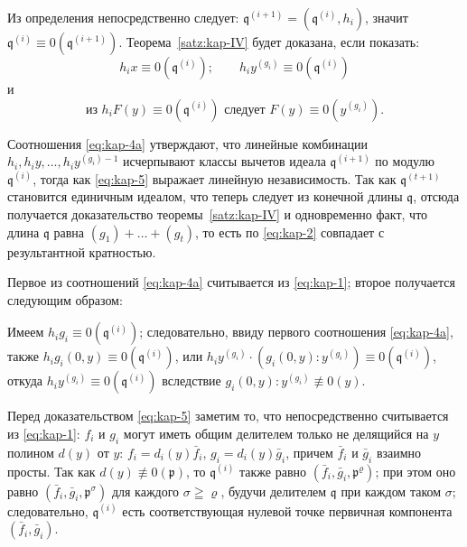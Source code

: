 \documentclass[11pt]{article}
\theoremstyle{plain}
\begin{document}
Из определения непосредственно следует:
$\mathfrak{q}^{(i+1)} = (\mathfrak{q}^{(i)}, h_{i})$, значит
$\mathfrak{q}^{(i)} \equiv 0(\mathfrak{q}^{(i+1)})$.
Теорема~\ref{satz:kap-IV} будет доказана, если показать:
\begin{equation}\label{eq:kap-4a}
h_{i}x \equiv 0(\mathfrak{q}^{(i)}); \qquad
h_{i}y^{(g_{i})} \equiv 0(\mathfrak{q}^{(i)})
\end{equation}
и
\begin{equation}\label{eq:kap-5}
\text{из } h_{i}F(y) \equiv 0(\mathfrak{q}^{(i)})
\text{ следует } F(y) \equiv 0(y^{(g_{i})}).
\end{equation}

Соотношения \eqref{eq:kap-4a} утверждают, что линейные комбинации
$h_{i}, h_{i}y, \ldots, h_{i}y^{(g_{i})-1}$ исчерпывают классы
вычетов идеала $\mathfrak{q}^{(i+1)}$ по модулю
$\mathfrak{q}^{(i)}$, тогда как \eqref{eq:kap-5} выражает линейную
независимость. Так как $\mathfrak{q}^{(t+1)}$ становится единичным
идеалом, что теперь следует из конечной длины $\mathfrak{q}$, отсюда
получается доказательство теоремы~\ref{satz:kap-IV} и одновременно
факт, что длина $\mathfrak{q}$ равна
$(g_1)+\ldots+(g_t)$, то есть по \eqref{eq:kap-2} совпадает
с результантной кратностью.

Первое из соотношений \eqref{eq:kap-4a} считывается из
\eqref{eq:kap-1}; второе получается следующим образом:

Имеем $h_{i}g_{i} \equiv 0(\mathfrak{q}^{(i)})$; следовательно, ввиду
первого соотношения \eqref{eq:kap-4a}, также
$h_{i}g_{i}(0,y) \equiv 0(\mathfrak{q}^{(i)})$, или
$h_iy^{(g_i)}\cdot(g_i(0,y):y^{(g_i)})\equiv0(\mathfrak{q}^{(i)})$,
откуда $h_{i}y^{(g_{i})} \equiv 0(\mathfrak{q}^{(i)})$
вследствие $g_{i}(0,y):y^{(g_{i})} \not\equiv 0(y)$.

Перед доказательством \eqref{eq:kap-5} заметим то, что
непосредственно считывается из \eqref{eq:kap-1}: $f_{i}$ и $g_{i}$
могут иметь общим делителем только не делящийся на $y$ полином
$d(y)$ от $y$: $f_{i} = d_{i}(y)\bar{f}_{i}$,
$g_{i} = d_{i}(y)\bar{g}_{i}$, причем $\bar{f}_{i}$ и
$\bar{g}_{i}$ взаимно просты. Так как
$d(y)\not\equiv0(\mathfrak{p})$, то
$\mathfrak{q}^{(i)}$ также равно
$(\bar f_i,\bar g_i,\mathfrak{p}^\varrho)$; при этом оно равно
$(\bar{f}_{i}, \bar{g}_{i}, \mathfrak{p}^{\sigma})$ для каждого
$\sigma\geqq\varrho$, будучи делителем $\mathfrak{q}$ при каждом
таком $\sigma$; следовательно, $\mathfrak{q}^{(i)}$ есть
соответствующая нулевой точке первичная компонента
$(\bar{f}_{i}, \bar{g}_{i})$.
\end{document}
